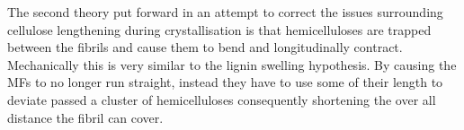 The second theory put forward in an attempt to correct the issues surrounding
cellulose lengthening during crystallisation is that 
hemicelluloses are trapped between the fibrils and cause them to bend and longitudinally contract. Mechanically this is very similar
to the lignin swelling hypothesis. By causing the MFs to no longer run straight,
instead they have to use some of their length to deviate passed a cluster of
hemicelluloses consequently shortening the over all distance the fibril can
cover. 